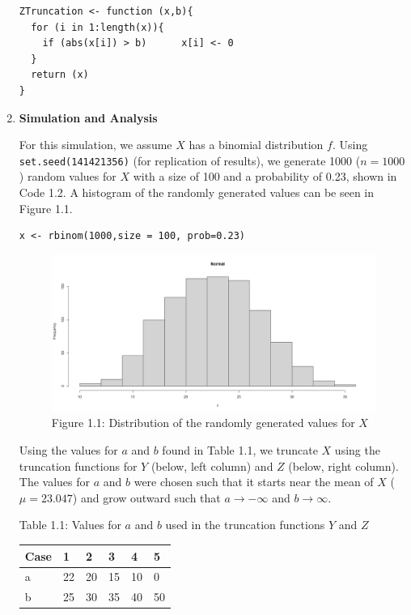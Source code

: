 \documentclass[12pt,letterpaper]{article}
\newcommand{\code}[1]{\colorbox{light-gray}{\texttt{#1}}}
\begin{document}
\begin{enumerate}[label=\Alph*]
\begin{lstlisting}[title=\footnotesize Code 1.1: Function for the truncation of $Y$ and $Z$]
ZTruncation <- function (x,b){
  for (i in 1:length(x)){
    if (abs(x[i]) > b)      x[i] <- 0
  }
  return (x)
}
        \end{lstlisting}
        \vspace*{0.5cm}
       \item \textbf{Simulation and Analysis} 
       
       For this simulation, we assume $X$ has a binomial distribution $f$. Using \code{set.seed(141421356)} (for replication of results), we generate 1000 ($n=1000$) random values for $X$ with a size of 100 and a probability of 0.23, shown in Code 1.2. A histogram of the randomly generated values can be seen in Figure 1.1.
       \begin{lstlisting}[title=\footnotesize Code 1.2: Initialization of $X$]
x <- rbinom(1000,size = 100, prob=0.23)  
       \end{lstlisting}

       \begin{figure}[h]
          \centering 
          \includegraphics[scale=0.4]{normal.png}
          \caption*{\footnotesize Figure 1.1: Distribution of the randomly generated values for $X$}
       \end{figure}
       
       \newpage
       Using the values for $a$ and $b$ found in Table 1.1, we truncate $X$ using the truncation functions for $Y$ (below, left column) and $Z$ (below, right column). The values for $a$ and $b$ were chosen such that it starts near the mean of $X$ ($\mu = 23.047$) and grow outward such that $a\rightarrow -\infty$ and $b \rightarrow \infty$.

       \begin{table}[H]\centering
          \footnotesize Table 1.1: Values for $a$ and $b$ used in the truncation functions $Y$ and $Z$

       \vspace*{0.3cm}
          \begin{tabular}{l|lllll} \toprule
            Case  & 1   &  2  &  3  &  4   &  5\\ \midrule
            a     & 22  &  20 &  15 &  10  &  0\\
            b     & 25  &  30 &  35 &  40  &  50\\ \bottomrule
          \end{tabular}
       \end{table}


\end{enumerate}
\end{document}
